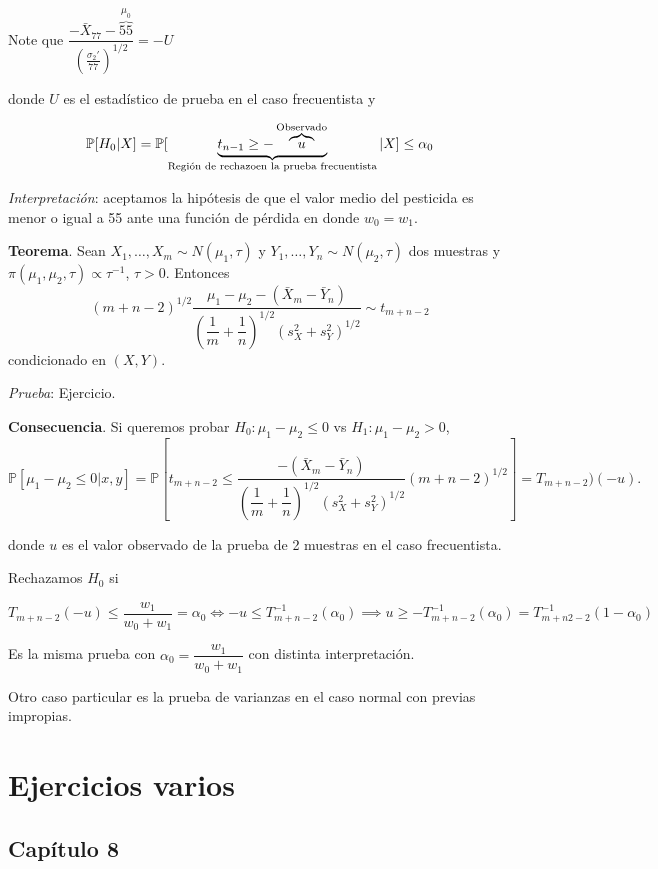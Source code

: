\documentclass[
  12pt,
]{book}
\begin{document}
Note que \(\dfrac{-\bar X_{77}-\overbrace{55}^{\mu_0} }{\left(\frac{\sigma_2'}{77}\right)^{1/2}} = -U\)

donde \(U\) es el estadístico de prueba en el caso frecuentista y

\[\mathbb P[H_0|X] = \mathbb P[\underbrace{t_{n-1}\geq -\overbrace{u}^{\text{Observado}}}_{\text{Región de rechazo}\\\text{en la prueba frecuentista}}|X]\leq \alpha_0\]

\emph{Interpretación}: aceptamos la hipótesis de que el valor medio del pesticida es menor o igual a 55 ante una función de pérdida en donde \(w_0 = w_1\).

\textbf{Teorema}. Sean \(X_1,\dots,X_m\sim N(\mu_1,\tau)\) y \(Y_1,\dots, Y_n\sim N(\mu_2,\tau)\) dos muestras y \(\pi(\mu_1,\mu_2,\tau)\propto \tau^{-1}\), \(\tau > 0\). Entonces
\[(m+n-2)^{1/2}\dfrac{\mu_1-\mu_2-(\bar X_{m}-\bar Y_n)}{\left(\dfrac 1m + \dfrac 1n\right)^{1/2}(s_X^2+s_Y^2)^{1/2}}\sim t_{m+n-2}\]
condicionado en \((X,Y)\).

\emph{Prueba}: Ejercicio.

\textbf{Consecuencia}. Si queremos probar \(H_0: \mu_1-\mu_2\leq 0\) vs \(H_1:\mu_1-\mu_2>0\),
\[\mathbb P[\mu_1-\mu_2\leq 0|x,y] = \mathbb P\left[t_{m+n-2}\leq \dfrac{-(\bar X_m-\bar Y_n)}{\left(\dfrac 1m + \dfrac 1n\right)^{1/2}(s_X^2+s_Y^2)^{1/2}}(m+n-2)^{1/2}\right] = T_{m+n-2})(-u).\]

donde \(u\) es el valor observado de la prueba de 2 muestras en el caso frecuentista.

Rechazamos \(H_0\) si

\[ T_{m+n-2}(-u)\leq \dfrac{w_1}{w_0+w_1}=\alpha_0 \Leftrightarrow -u\leq T_{m+n-2}^{-1}(\alpha_0) \implies u\geq -T_{m+n-2}^{-1}(\alpha_0) = T_{m+n2-2}^{-1}(1-\alpha_0)\]

Es la misma prueba con \(\alpha_0 = \dfrac{w_1}{w_0+w_1}\) con distinta interpretación.

Otro caso particular es la prueba de varianzas en el caso normal con previas impropias.

\hypertarget{ejercicios-varios}{%
\chapter{Ejercicios varios}\label{ejercicios-varios}}

\hypertarget{capuxedtulo-8}{%
\section{Capítulo 8}\label{capuxedtulo-8}}
\end{document}
